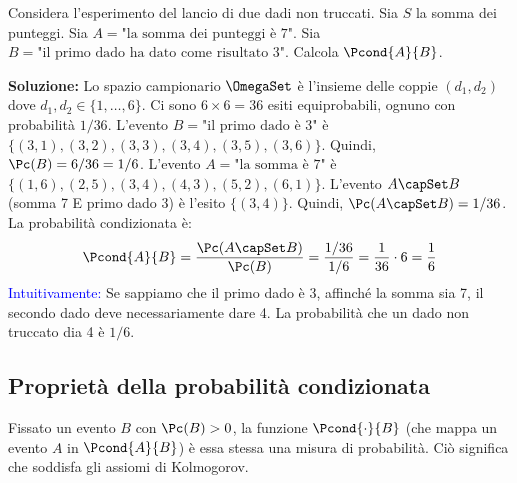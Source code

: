 \begin{exercise}
Considera l'esperimento del lancio di due dadi non truccati.
Sia $S$ la somma dei punteggi.
Sia $A = \text{"la somma dei punteggi è 7"}$.
Sia $B = \text{"il primo dado ha dato come risultato 3"}$.
Calcola $\Pcond{A}{B}$.
\end{exercise}
\textbf{Soluzione:}
Lo spazio campionario $\OmegaSet$ è l'insieme delle coppie $(d_1, d_2)$ dove $d_1, d_2 \in \{1, \dots, 6\}$. Ci sono $6 \times 6 = 36$ esiti equiprobabili, ognuno con probabilità $1/36$.
L'evento $B = \text{"il primo dado è 3"}$ è $\{(3,1), (3,2), (3,3), (3,4), (3,5), (3,6)\}$.
Quindi, $\Pc(B) = 6/36 = 1/6$.
L'evento $A = \text{"la somma è 7"}$ è $\{(1,6), (2,5), (3,4), (4,3), (5,2), (6,1)\}$.
L'evento $A \capSet B$ (somma 7 E primo dado 3) è l'esito $\{(3,4)\}$.
Quindi, $\Pc(A \capSet B) = 1/36$.
La probabilità condizionata è:
\[ \Pcond{A}{B} = \frac{\Pc(A \capSet B)}{\Pc(B)} = \frac{1/36}{1/6} = \frac{1}{36} \cdot 6 = \frac{1}{6} \]
\textcolor{blue}{Intuitivamente:} Se sappiamo che il primo dado è 3, affinché la somma sia 7, il secondo dado deve necessariamente dare 4. La probabilità che un dado non truccato dia 4 è $1/6$.

\subsection{Proprietà della probabilità condizionata}
Fissato un evento $B$ con $\Pc(B)>0$, la funzione $\Pcond{\cdot}{B}$ (che mappa un evento $A$ in $\Pcond{A}{B}$) è essa stessa una misura di probabilità. Ciò significa che soddisfa gli assiomi di Kolmogorov.

